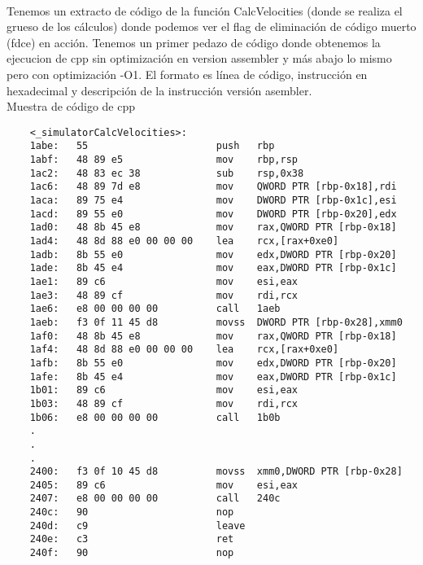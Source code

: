 ~\\

Tenemos un extracto de código de la función CalcVelocities (donde se realiza el grueso de los cálculos) donde podemos ver el flag de eliminación de código muerto (fdce) en acción. Tenemos un primer pedazo de código donde obtenemos la ejecucion de cpp sin optimización en version assembler y más abajo lo mismo pero con optimización -O1. 
El formato es línea de código, instrucción en hexadecimal y descripción de la instrucción versión asembler.\\

Muestra de código de cpp 
\begin{verbatim}
	<_simulatorCalcVelocities>:
    1abe:	55                   	push   rbp
    1abf:	48 89 e5             	mov    rbp,rsp
    1ac2:	48 83 ec 38          	sub    rsp,0x38
    1ac6:	48 89 7d e8          	mov    QWORD PTR [rbp-0x18],rdi
    1aca:	89 75 e4             	mov    DWORD PTR [rbp-0x1c],esi
    1acd:	89 55 e0             	mov    DWORD PTR [rbp-0x20],edx
    1ad0:	48 8b 45 e8          	mov    rax,QWORD PTR [rbp-0x18]
    1ad4:	48 8d 88 e0 00 00 00 	lea    rcx,[rax+0xe0]
    1adb:	8b 55 e0             	mov    edx,DWORD PTR [rbp-0x20]
    1ade:	8b 45 e4             	mov    eax,DWORD PTR [rbp-0x1c]
    1ae1:	89 c6                	mov    esi,eax
    1ae3:	48 89 cf             	mov    rdi,rcx
    1ae6:	e8 00 00 00 00       	call   1aeb 
    1aeb:	f3 0f 11 45 d8       	movss  DWORD PTR [rbp-0x28],xmm0
    1af0:	48 8b 45 e8          	mov    rax,QWORD PTR [rbp-0x18]
    1af4:	48 8d 88 e0 00 00 00 	lea    rcx,[rax+0xe0]
    1afb:	8b 55 e0             	mov    edx,DWORD PTR [rbp-0x20]
    1afe:	8b 45 e4             	mov    eax,DWORD PTR [rbp-0x1c]
    1b01:	89 c6                	mov    esi,eax
    1b03:	48 89 cf             	mov    rdi,rcx
    1b06:	e8 00 00 00 00       	call   1b0b 
    .
    .
    .
    2400:	f3 0f 10 45 d8       	movss  xmm0,DWORD PTR [rbp-0x28]
    2405:	89 c6                	mov    esi,eax
    2407:	e8 00 00 00 00       	call   240c 
    240c:	90                   	nop
    240d:	c9                   	leave  
    240e:	c3                   	ret    
    240f:	90                   	nop
\end{verbatim}

